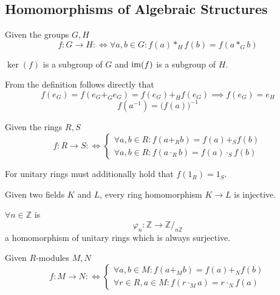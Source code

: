 \subsection{Homomorphisms of Algebraic Structures}
\begin{definition}
   Given the groups \(G, H\)
   \[f: G \to H :\iff \forall a, b \in G: f(a) \ast_H f(b) = f(a \ast_G b)\]
\end{definition}
\begin{remark}
   \(\ker(f)\) is a subgroup of \(G\) and \(\operatorname{im}(f)\) is a subgroup of \(H\).
\end{remark}
\begin{remark}
   From the definition follows directly that
   \[f(e_G) = f(e_G +_G e_G) = f(e_G) +_H f(e_G) \implies f(e_G) = e_H\]
   \[f(a^{-1}) = \big(f(a)\big)^{-1}\]
\end{remark}

\begin{definition}\label{def:ring_homo}
   Given the rings \(R, S\)
   \[f: R \to S :\iff \begin{cases}
            \forall a, b \in R: f(a +_R b) = f(a) +_S f(b) \\
            \forall a, b \in R: f(a \cdot_R b) = f(a) \cdot_S f(b)
      \end{cases}\]
\end{definition}
\begin{remark}
   For unitary rings must additionally hold that \(f(1_R) = 1_S\).
\end{remark}
\begin{remark}
   Given two fields \(K\) and \(L\), every ring homomorphism \(K \to L\) is injective.
\end{remark}
\begin{example}
   \(\forall n \in \mathbb{Z}\) is
   \[\varphi_n: \mathbb{Z} \to \mathbb{Z}/_{n\mathbb{Z}}\]
   a homomorphism of unitary rings which is always surjective.
\end{example}

\begin{definition}
   Given \(R\)-modules \(M, N\)
   \[f: M \to N :\iff \begin{cases}
         \forall a, b \in M: f(a +_M b) = f(a) +_N f(b) \\
         \forall r \in R, a \in M: f(r \cdot_M a) = r \cdot_N f(a)
      \end{cases}\]
\end{definition}

